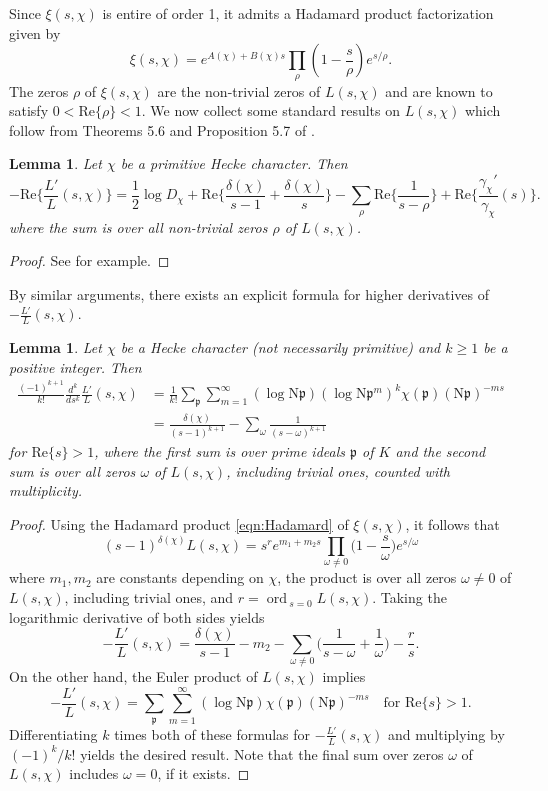 \documentclass[12pt,psamsfonts]{amsart}
\newtheorem{lem}[thm]{Lemma}
\theoremstyle{definition}
\theoremstyle{remark}
\numberwithin{equation}{section}
\theoremstyle{plain}
\theoremstyle{remark}
\newcommand{\ds}{\displaystyle}
\renewcommand{\1}{ {\bf 1}}
\newcommand{\N}{\mathrm{N}}
\newcommand{\kp}{\mathfrak{p}}
\newcommand{\ord}{\mathrm{ord}\,}
\renewcommand{\Re}{\mathrm{Re}}
\begin{document}
Since $\xi(s,\chi)$ is entire of order 1, it admits a Hadamard product factorization given by
\begin{equation}
\label{eqn:Hadamard}
\xi(s,\chi)=e^{A(\chi)+B(\chi)s}\prod_{\rho }\left(1-\frac{s}{\rho}\right)e^{s/\rho}.
\end{equation}
The zeros $\rho$ of $\xi(s,\chi)$ are the non-trivial zeros of $L(s,\chi)$ and are known to satisfy $0 < \Re\{\rho\} < 1$. We now collect some standard results on $L(s,\chi)$ which follow from Theorems 5.6 and Proposition 5.7 of \cite{IK}.

\begin{lem} \label{ExplicitFormula} Let $\chi$ be a primitive Hecke character. Then
\[
- \Re\Big\{\frac{L'}{L}(s,\chi)\Big\} = \frac{1}{2} \log D_{\chi} +\Re\Big\{\frac{\delta(\chi)}{s-1}+ \frac{\delta(\chi)}{s}\Big\} -  \sum_{\rho }\Re\Big\{ \frac{1}{s-\rho}\Big\}  + \Re\Big\{\frac{\gamma_{\chi}'}{\gamma_{\chi}}(s)\Big\}.
\]
where the sum is over all non-trivial zeros $\rho$ of $L(s,\chi)$. 
\end{lem}
\begin{proof} See \cite[Lemma 5.1]{LO} for example. 
\end{proof}
By similar arguments, there exists an explicit formula for higher derivatives of $-\frac{L'}{L}(s,\chi)$. 
\begin{lem} \label{ExplicitFormula_HigherDerivatives}
Let $\chi$ be a Hecke character (not necessarily primitive) and $k \geq 1$ be a positive integer. Then
\begin{align*}
\frac{(-1)^{k+1}}{k!} \frac{d^k}{ds^k} \frac{L'}{L}(s,\chi) & = 
\frac{1}{k!} \sum_{\kp} \sum_{m=1}^{\infty} (\log \N\kp) (\log \N\kp^m)^k \chi(\kp) (\N\kp)^{-ms}  \\
&  = \frac{\delta(\chi)}{(s-1)^{k+1}}  -  \sum_{\omega} \frac{1}{(s-\omega)^{k+1}}
\end{align*}
for $\Re\{s\} > 1$, where the first sum is over prime ideals $\kp$ of $K$ and the second sum is over all zeros $\omega$ of $L(s,\chi)$, including trivial ones, counted with multiplicity. 
\end{lem}
\begin{proof}  
Using the Hadamard product \eqref{eqn:Hadamard} of $\xi(s,\chi)$, it follows that
\[
(s-1)^{\delta(\chi)} L(s,\chi) = s^r e^{m_1 +m_2s} \prod_{\omega \neq 0} \Big(1-\frac{s}{\omega} \Big) e^{s/\omega}
\] 
where $m_1,m_2$ are constants depending on $\chi$, the product is over all zeros $\omega \neq 0$ of $L(s,\chi)$, including trivial ones, and $r = \ds\mathop{\ord}_{s= 0} L(s,\chi)$. 
 Taking the logarithmic derivative of both sides yields
\[
- \frac{L'}{L}(s,\chi) = \frac{\delta(\chi)}{s-1} - m_2  - \sum_{\omega \neq 0} \Big( \frac{1}{s-\omega} + \frac{1}{\omega} \Big)  - \frac{r}{s}. 
\]
On the other hand, the Euler product of $L(s,\chi)$ implies
\[
- \frac{L'}{L}(s,\chi) = \sum_{\kp} \sum_{m=1}^{\infty} (\log \N\kp)   \chi(\kp) (\N\kp)^{-ms} \quad \text{for $\Re\{s\} > 1$}. 
\]
Differentiating $k$ times both of these formulas for $ - \frac{L'}{L}(s,\chi)$  and multiplying by $(-1)^k/k!$ yields the desired result. Note that the final sum over zeros $\omega$ of $L(s,\chi)$ includes $\omega = 0$, if it exists. 
\end{proof}
\end{document}
